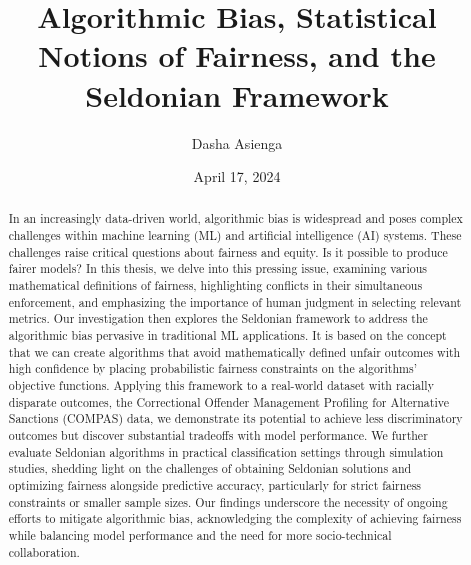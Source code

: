 \documentclass[12pt, twoside]{amherstthesis}
\title{Algorithmic Bias, Statistical Notions of Fairness, and the Seldonian Framework}
\author{Dasha Asienga}
\date{April 17, 2024}
\begin{document}
\doublespace
  \maketitle

\frontmatter %
\pagestyle{fancyplain}

  \begin{abstract}
    In an increasingly data-driven world, algorithmic bias is widespread and poses complex challenges within machine learning (ML) and artificial intelligence (AI) systems. These challenges raise critical questions about fairness and equity. Is it possible to produce fairer models? In this thesis, we delve into this pressing issue, examining various mathematical definitions of fairness, highlighting conflicts in their simultaneous enforcement, and emphasizing the importance of human judgment in selecting relevant metrics. Our investigation then explores the Seldonian framework to address the algorithmic bias pervasive in traditional ML applications. It is based on the concept that we can create algorithms that avoid mathematically defined unfair outcomes with high confidence by placing probabilistic fairness constraints on the algorithms' objective functions. Applying this framework to a real-world dataset with racially disparate outcomes, the Correctional Offender Management Profiling for Alternative Sanctions (COMPAS) data, we demonstrate its potential to achieve less discriminatory outcomes but discover substantial tradeoffs with model performance. We further evaluate Seldonian algorithms in practical classification settings through simulation studies, shedding light on the challenges of obtaining Seldonian solutions and optimizing fairness alongside predictive accuracy, particularly for strict fairness constraints or smaller sample sizes. Our findings underscore the necessity of ongoing efforts to mitigate algorithmic bias, acknowledging the complexity of achieving fairness while balancing model performance and the need for more socio-technical collaboration.
  \end{abstract}
\end{document}
